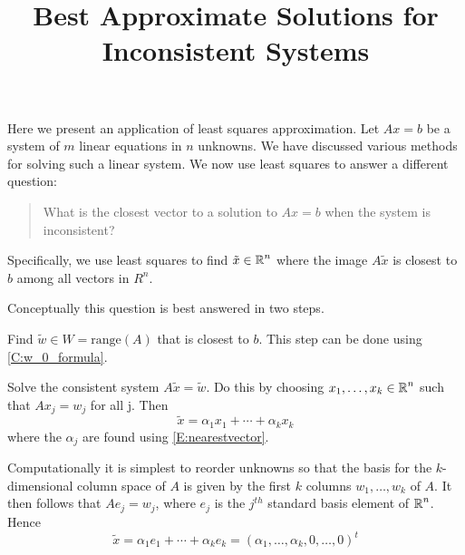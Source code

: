 \documentclass{ximera}
\title{Best Approximate Solutions for Inconsistent Systems}
\begin{document}
\begin{abstract}
\end{abstract}
\maketitle

\label{S:BAS}

Here we present an application of least squares approximation.
Let $Ax = b$ be a system of $m$ linear equations in $n$ unknowns.  
We have discussed various methods for solving such a linear system.  
We now use least squares to answer a different question: 
\begin{quote}
What is the closest vector to a solution to $Ax = b$ when the system is inconsistent?  
\end{quote}
Specifically, we use least squares to find $\tilde{x}\in\mbox{$\mathbb{R}$}^n$ where 
the image $A\tilde{x}$ is closest to $b$ among all vectors in $R^n$. 

Conceptually this question is best answered in two steps.  
\begin{enumeratea}
\item Find $\tilde{w}\in W = \mathrm{range}(A)$ that is closest to $b$.  
This step can be done using \eqref{C:w_0_formula}.
\item Solve the consistent system $A\tilde{x} = \tilde{w}$.  Do this by choosing  
$x_1,\ldots,x_k\in\mbox{$\mathbb{R}$}^n$ such that $Ax_j = w_j$ for all j.  Then 
\[
\tilde{x} = \alpha_1 x_1 + \cdots + \alpha_k x_k
\]
where the $\alpha_j$ are found using \eqref{E:nearestvector}.
\end{enumeratea} 
Computationally it is simplest to reorder unknowns so that the basis for the 
$k$-dimensional column space of $A$ is given by the first $k$ columns 
$w_1,\ldots,w_k$ of $A$. It then follows that $Ae_j = w_j$, where $e_j$ 
is the $j^{th}$ standard basis element of $\mbox{$\mathbb{R}$}^n$.  Hence
\[
\tilde{x} = \alpha_1 e_1 + \cdots + \alpha_k e_k  
= (\alpha_1,\ldots,\alpha_k, 0, \ldots,0)^t
\]
\end{document}
